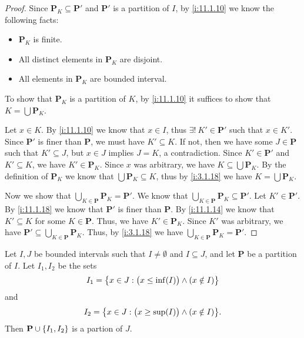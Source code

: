 \begin{proof}
  Since \(\mathbf{P}_K \subseteq \mathbf{P}'\) and \(\mathbf{P}'\) is a partition of \(I\), by \cref{i:11.1.10} we know the following facts:
  \begin{itemize}
    \item \(\mathbf{P}_K\) is finite.
    \item All distinct elements in \(\mathbf{P}_K\) are disjoint.
    \item All elements in \(\mathbf{P}_K\) are bounded interval.
  \end{itemize}
  To show that \(\mathbf{P}_K\) is a partition of \(K\), by \cref{i:11.1.10} it suffices to show that \(K = \bigcup \mathbf{P}_K\).

  Let \(x \in K\).
  By \cref{i:11.1.10} we know that \(x \in I\), thus \(\exists!\ K' \in \mathbf{P}'\) such that \(x \in K'\).
  Since \(\mathbf{P}'\) is finer than \(\mathbf{P}\), we must have \(K' \subseteq K\).
  If not, then we have some \(J \in \mathbf{P}\) such that \(K' \subseteq J\), but \(x \in J\) implies \(J = K\), a contradiction.
  Since \(K' \in \mathbf{P}'\) and \(K' \subseteq K\), we have \(K' \in \mathbf{P}_K\).
  Since \(x\) was arbitrary, we have \(K \subseteq \bigcup \mathbf{P}_K\).
  By the definition of \(\mathbf{P}_K\) we know that \(\bigcup \mathbf{P}_K \subseteq K\), thus by \cref{i:3.1.18} we have \(K = \bigcup \mathbf{P}_K\).

  Now we show that \(\bigcup_{K \in \mathbf{P}} \mathbf{P}_K = \mathbf{P}'\).
  We know that \(\bigcup_{K \in \mathbf{P}} \mathbf{P}_K \subseteq \mathbf{P}'\).
  Let \(K' \in \mathbf{P}'\).
  By \cref{i:11.1.18} we know that \(\mathbf{P}'\) is finer than \(\mathbf{P}\).
  By \cref{i:11.1.14} we know that \(K' \subseteq K\) for some \(K \in \mathbf{P}\).
  Thus, we have \(K' \in \mathbf{P}_K\).
  Since \(K'\) was arbitrary, we have \(\mathbf{P}' \subseteq \bigcup_{K \in \mathbf{P}} \mathbf{P}_K\).
  Thus, by \cref{i:3.1.18} we have \(\bigcup_{K \in \mathbf{P}} \mathbf{P}_K = \mathbf{P}'\).
\end{proof}

\begin{ac}\label{i:ac:11.1.5}
  Let \(I, J\) be bounded intervals such that \(I \neq \emptyset\) and \(I \subseteq J\), and let \(\mathbf{P}\) be a partition of \(I\).
  Let \(I_1, I_2\) be the sets
  \[
    I_1 = \left\lbrace x \in J : \big(x \leq \inf(I)\big) \land (x \notin I)\right\rbrace
  \]
  and
  \[
    I_2 = \set{x \in J : \big(x \geq \sup(I)\big) \land (x \notin I)}.
  \]
  Then \(\mathbf{P} \cup \left\lbrace I_1, I_2\right\rbrace\) is a partion of \(J\).
\end{ac}

